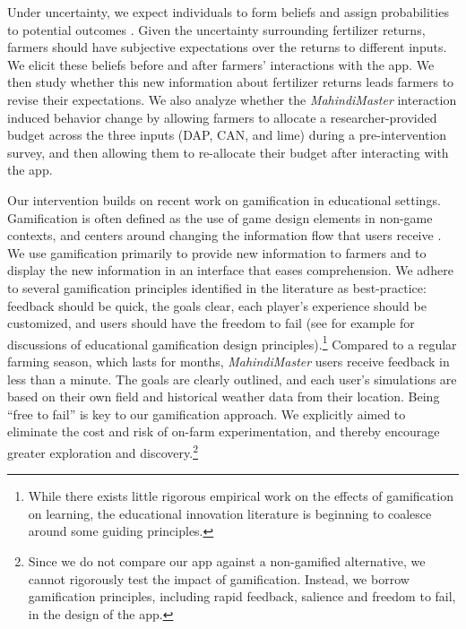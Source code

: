 \documentclass[12pt,letterpaper]{article}
\begin{document}
Under uncertainty, we expect individuals to form beliefs and assign probabilities to potential outcomes \citep{delavande_probabilistic_2014}. Given the uncertainty surrounding fertilizer returns, farmers should have subjective expectations over the returns to different inputs. We elicit these beliefs before and after farmers' interactions with the app. We then study whether this new information about fertilizer returns leads farmers to revise their expectations. We also analyze whether the \textit{MahindiMaster} interaction induced behavior change by allowing farmers to allocate a researcher-provided budget across the three inputs (DAP, CAN, and lime) during a pre-intervention survey, and then allowing them to re-allocate their budget after interacting with the app.


Our intervention builds on recent work on gamification in educational settings. Gamification is often defined as the use of game design elements in non-game contexts, and centers around changing the information flow that users receive \citep{walz_gameful_2015}. We use gamification primarily to provide new information to farmers and to display the new information in an interface that eases comprehension. We adhere to several gamification principles identified in the literature as best-practice: feedback should be quick, the goals clear,  each player's experience should be customized, and users should have the freedom to fail (see for example \citealt{simoes_social_2013, lee_gamification_2011,gordon_maximising_2013} for discussions of educational gamification design principles).\footnote{While there exists little rigorous empirical work on the effects of gamification on learning, the educational innovation literature is beginning to coalesce around some guiding principles.} Compared to a regular farming season, which lasts for months, \textit{MahindiMaster} users receive feedback in less than a minute. The goals are clearly outlined, and each user's simulations are based on their own field and historical weather data from their location. Being ``free to fail'' is key to our gamification approach. We explicitly aimed to eliminate the cost and risk of on-farm experimentation, and thereby encourage greater exploration and discovery.\footnote{Since we do not compare our app against a non-gamified alternative, we cannot rigorously test the impact of gamification. Instead, we borrow gamification principles, including rapid feedback, salience and freedom to fail, in the design of the app.}
\end{document}
